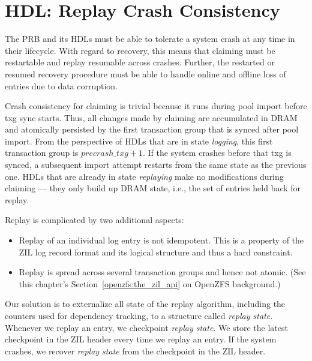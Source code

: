 \documentclass[12pt,a4paper,twoside]{book}
\begin{document}
{\section{HDL: Replay Crash Consistency}\label{di:prb:ccrecovery}

The PRB and its HDLs must be able to tolerate a system crash at any time in their lifecycle.
With regard to recovery, this means that claiming must be restartable and replay resumable across crashes.
Further, the restarted or resumed recovery procedure must be able to handle online and offline loss of entries due to data corruption.

Crash consistency for claiming is trivial because it runs during pool import before txg sync starts.
Thus, all changes made by claiming are accumulated in DRAM and atomically persisted by the first transaction group that is synced after pool import.
From the perspective of HDLs that are in state \textit{logging}, this first transaction group is $precrash\_txg + 1$.
If the system crashes before that txg is synced, a subsequent import attempt restarts from the same state as the previous one.
HDLs that are already in state \textit{replaying} make no modifications during claiming --- they only build up DRAM state, i.e., the set of entries held back for replay.

Replay is complicated by two additional aspects:
\begin{itemize}[noitemsep]
    \item Replay of an individual log entry is not idempotent. This is a property of the ZIL log record format and its logical structure and thus a hard constraint.
    \item Replay is spread across several transaction groups and hence not atomic.
        (See this chapter's Section~\ref{openzfs:the_zil_api} on OpenZFS background.)
\end{itemize}
Our solution is to externalize all state of the replay algorithm, including the counters used for dependency tracking, to a structure called \textit{replay state}.
Whenever we replay an entry, we checkpoint \textit{replay state}.
We store the latest checkpoint in the ZIL header every time we replay an entry.
If the system crashes, we recover \textit{replay state} from the checkpoint in the ZIL header.

}
\end{document}
